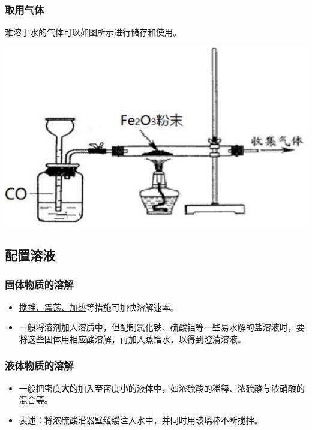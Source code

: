 \documentclass[10pt]{article}
\begin{document}
	\subsubsection{取用气体}
	
	难溶于水的气体可以如图所示进行储存和使用。
	
	\begin{center}
		\includegraphics[scale=0.2]{res/gas.pdf}
	\end{center}
	
	
	\subsection{配置溶液}
	
	\subsubsection{固体物质的溶解}
	
	\begin{itemize}
		\item \underline{搅拌、震荡、加热}等措施可加快溶解速率。
		\item 一般将溶剂加入溶质中，但配制氯化铁、硫酸铝等一些易水解的盐溶液时，要将这些固体用相应酸溶解，再加入蒸馏水，以得到澄清溶液。
	\end{itemize}
	
	\subsubsection{液体物质的溶解}
	
	\begin{itemize}
		\item 一般把密度\textbf{大}的加入至密度\textbf{小}的液体中，如浓硫酸的稀释、浓硫酸与浓硝酸的混合等。
		\item 表述：将浓硫酸沿器壁缓缓注入水中，并同时用玻璃棒不断搅拌。
	\end{itemize}
	
\end{document}
